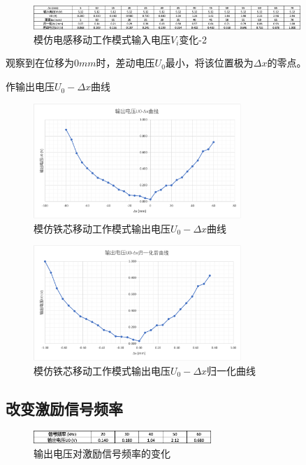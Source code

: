 \documentclass{article}
\begin{document}
\begin{figure}[htbp]
   \centering
   \includegraphics[width=0.9\textwidth]{osc-4.png}
   \caption{模仿电感移动工作模式输入电压$V_i$变化-2}
\end{figure}

观察到在位移为$0 mm$时，差动电压$U_0$最小，将该位置极为$\Delta x$的零点。

作输出电压$U_0 - \Delta x$曲线

\begin{figure}[htbp]
   \centering
   \includegraphics[width=0.7\textwidth]{osc-curve1.png}
   \caption{模仿铁芯移动工作模式输出电压$U_0 - \Delta x$曲线}
 \end{figure}

\begin{figure}[htbp]
   \centering
   \includegraphics[width=0.7\textwidth]{osc-curve2.png}
   \caption{模仿铁芯移动工作模式输出电压$U_0 - \Delta x$归一化曲线}
\end{figure}

\newpage

\subsection{改变激励信号频率}
\begin{figure}[htbp]
   \centering
   \includegraphics[width=0.6\textwidth]{osc-5.png}
   \caption{输出电压对激励信号频率的变化}
\end{figure}
\end{document}
